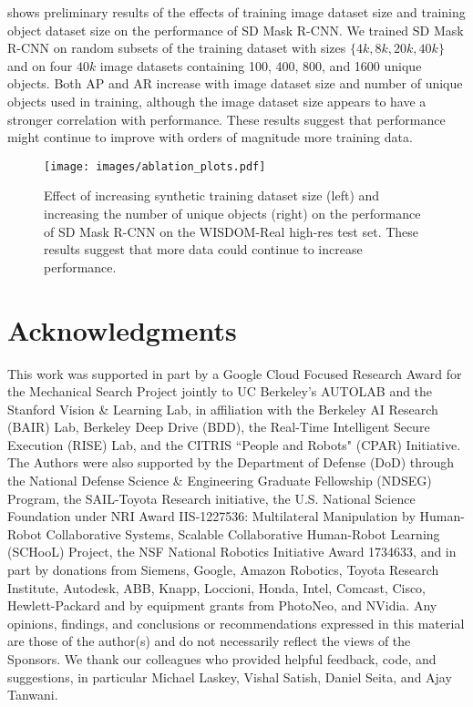 \documentclass[letterpaper, 10 pt, conference]{ieeeconf}  \pdfoutput=1
\numberwithin{equation}{section}
\begin{document}
 shows preliminary results of the effects of training image dataset size and training object dataset size on the performance of SD Mask R-CNN. We trained SD Mask R-CNN on random subsets of the training dataset with sizes $\{4k, 8k, 20k, 40k\}$ and on four $40k$ image datasets containing 100, 400, 800, and 1600 unique objects. Both AP and AR increase with image dataset size and number of unique objects used in training, although the image dataset size appears to have a stronger correlation with performance. These results suggest that performance might continue to improve with orders of magnitude more training data.

\begin{figure}[t!]
    \centering
    \texttt{[image: images/ablation\_plots.pdf]}
    \caption{Effect of increasing synthetic training dataset size (left) and increasing the number of unique objects (right) on the performance of SD Mask R-CNN on the WISDOM-Real high-res test set. These results suggest that more data could continue to increase performance.}
\end{figure} \section{Acknowledgments}
\footnotesize
This work was supported in part by a Google Cloud Focused Research Award for the Mechanical Search Project jointly to UC Berkeley's AUTOLAB and the Stanford Vision \& Learning Lab, in affiliation with the Berkeley AI Research (BAIR) Lab, Berkeley Deep Drive (BDD), the Real-Time Intelligent Secure Execution (RISE) Lab, and the CITRIS ``People and Robots" (CPAR) Initiative. The Authors were also supported by the Department of Defense (DoD) through the National Defense Science \& Engineering Graduate Fellowship (NDSEG) Program, the SAIL-Toyota Research initiative, the U.S. National Science Foundation under NRI Award IIS-1227536: Multilateral Manipulation by Human-Robot Collaborative Systems, Scalable Collaborative Human-Robot Learning (SCHooL) Project, the NSF National Robotics Initiative Award 1734633, and in part by donations from Siemens, Google, Amazon Robotics, Toyota Research Institute, Autodesk, ABB, Knapp, Loccioni, Honda, Intel, Comcast, Cisco, Hewlett-Packard and by equipment grants from PhotoNeo, and NVidia. Any opinions, findings, and conclusions or recommendations expressed in this material are those of the author(s) and do not necessarily reflect the views of the Sponsors. We thank our colleagues who provided helpful feedback, code, and suggestions, in particular Michael Laskey, Vishal Satish, Daniel Seita, and Ajay Tanwani.
\normalsize
\end{document}
